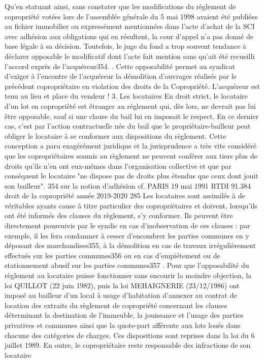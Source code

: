 		Qu'en statuant ainsi, sans constater que les modifications du règlement de copropriété votées lors de l'assemblée générale du 5 mai 1998 avaient été publiées au fichier immobilier ou expressément mentionnées dans l'acte d'achat de la SCI avec adhésion aux obligations qui en résultent, la cour d'appel n'a pas donné de base légale à sa décision.
		Toutefois, le juge du fond a trop souvent tendance à déclarer opposable le modificatif dont l'acte fait mention sans qu'ait été recueilli l'accord exprès de l'acquéreur354. .
		Cette opposabilité permet au syndicat d'exiger à l'encontre de l'acquéreur la démolition d'ouvrages réalisés par le précédent copropriétaire en violation des droits de la Copropriété. L'acquéreur est tenu au lieu et place du vendeur !
		3. Les locataires
		En droit strict, le locataire d'un lot en copropriété est étranger au règlement qui, dès lors, ne devrait pas lui être opposable, sauf si une clause du bail lui en imposait le respect. En ce dernier cas, c'est par l'action contractuelle née du bail que le propriétaire-bailleur peut obliger le locataire à se conformer aux dispositions du règlement.
		Cette conception a paru exagérément juridique et la jurisprudence a très vite considéré que les copropriétaires soumis au règlement ne peuvent conférer aux tiers plus de droits qu'ils n'en ont eux-mêmes dans l'organisation collective et que par conséquent le locataire "ne dispose pas de droits plus étendus que ceux dont jouit son bailleur".
		354 sur la notion d'adhésion cf. PARIS 19 mai 1991 RTDI 91.384
		droit de la copropriété année 2019-2020
		285
		Les locataires sont assimilés à de véritables ayants cause à titre particulier des copropriétaires et doivent, lorsqu'ils ont été informés des clauses du règlement, s'y conformer. Ils peuvent être directement poursuivis par le syndic en cas d'inobservation de ces clauses : par exemple, il les fera condamner à cesser d'encombrer les parties communes en y déposant des marchandises355, à la démolition en cas de travaux irrégulièrement effectués sur les parties communes356 ou en cas d'empiétement ou de stationnement abusif sur les parties communes357 .
		Pour que l'opposabilité du règlement au locataire puisse fonctionner sans encourir la moindre objection, la loi QUILLOT (22 juin 1982), puis la loi MEHAIGNERIE (23/12/1986) ont imposé au bailleur d’un local à usage d’habitation d'annexer au contrat de location des extraits du règlement de copropriété concernant les clauses déterminant la destination de l'immeuble, la jouissance et l'usage des parties privatives et communes ainsi que la quote-part afférente aux lots loués dans chacune des catégories de charges. Ces dispositions sont reprises dans la loi du 6 juillet 1989.
		En outre, le copropriétaire reste responsable des infractions de son locataire
	
